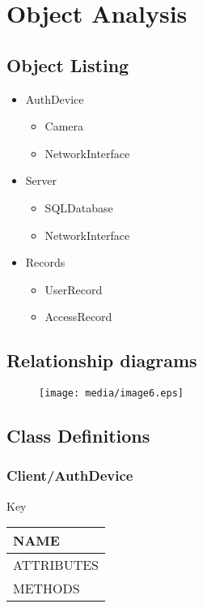 \documentclass[12pt,a4paper]{report}
\begin{document}
\section{Object Analysis}\label{section:_Toc370402515}
\subsection{Object Listing}\label{section:_Toc370402516}
\begin{itemize}
\item AuthDevice
\begin{itemize}
\item Camera
\item NetworkInterface
\end{itemize}
\item Server
\begin{itemize}
\item SQLDatabase
\item NetworkInterface
\end{itemize}
\item Records
\begin{itemize}
\item UserRecord
\item AccessRecord
\end{itemize}
\end{itemize}



\subsection{Relationship diagrams}

\begin{figure}[H]
\texttt{[image: media/image6.eps]}
\end{figure}


\subsection{Class Definitions}
\subsubsection{Client/AuthDevice}

Key

\begin{tabular}{|l|}
\hline
NAME \\
\hline
ATTRIBUTES \\
\hline
METHODS \\
\hline
\end{tabular}
\end{document}

